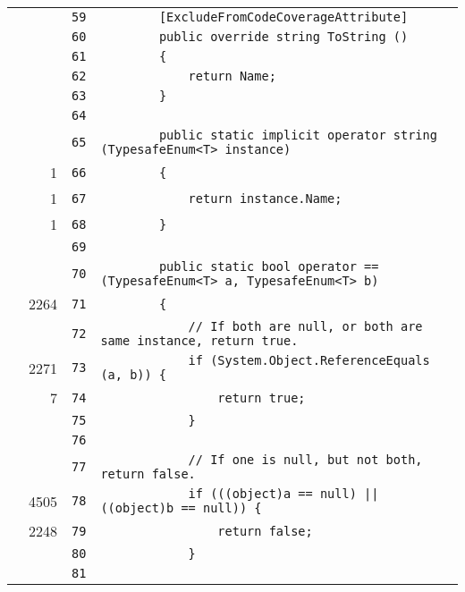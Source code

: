 \documentclass[a4paper,10pt]{article}
\begin{document}
\begin{longtable}[l]{lrrl}
\cellcolor{gray} &  & \verb~59~ & \verb~        [ExcludeFromCodeCoverageAttribute]~\\
\cellcolor{gray} &  & \verb~60~ & \verb~        public override string ToString ()~\\
\cellcolor{gray} &  & \verb~61~ & \verb~        {~\\
\cellcolor{gray} &  & \verb~62~ & \verb~            return Name;~\\
\cellcolor{gray} &  & \verb~63~ & \verb~        }~\\
\cellcolor{gray} &  & \verb~64~ & \verb~~\\
\cellcolor{gray} &  & \verb~65~ & \verb~        public static implicit operator string (TypesafeEnum<T> instance)~\\
\cellcolor{green} & 1 & \verb~66~ & \verb~        {~\\
\cellcolor{green} & 1 & \verb~67~ & \verb~            return instance.Name;~\\
\cellcolor{green} & 1 & \verb~68~ & \verb~        }~\\
\cellcolor{gray} &  & \verb~69~ & \verb~~\\
\cellcolor{gray} &  & \verb~70~ & \verb~        public static bool operator == (TypesafeEnum<T> a, TypesafeEnum<T> b)~\\
\cellcolor{green} & 2264 & \verb~71~ & \verb~        {~\\
\cellcolor{gray} &  & \verb~72~ & \verb~            // If both are null, or both are same instance, return true.~\\
\cellcolor{green} & 2271 & \verb~73~ & \verb~            if (System.Object.ReferenceEquals (a, b)) {~\\
\cellcolor{green} & 7 & \verb~74~ & \verb~                return true;~\\
\cellcolor{gray} &  & \verb~75~ & \verb~            }~\\
\cellcolor{gray} &  & \verb~76~ & \verb~~\\
\cellcolor{gray} &  & \verb~77~ & \verb~            // If one is null, but not both, return false.~\\
\cellcolor{green} & 4505 & \verb~78~ & \verb~            if (((object)a == null) || ((object)b == null)) {~\\
\cellcolor{green} & 2248 & \verb~79~ & \verb~                return false;~\\
\cellcolor{gray} &  & \verb~80~ & \verb~            }~\\
\cellcolor{gray} &  & \verb~81~ & \verb~~\\

\end{longtable}
\end{document}
